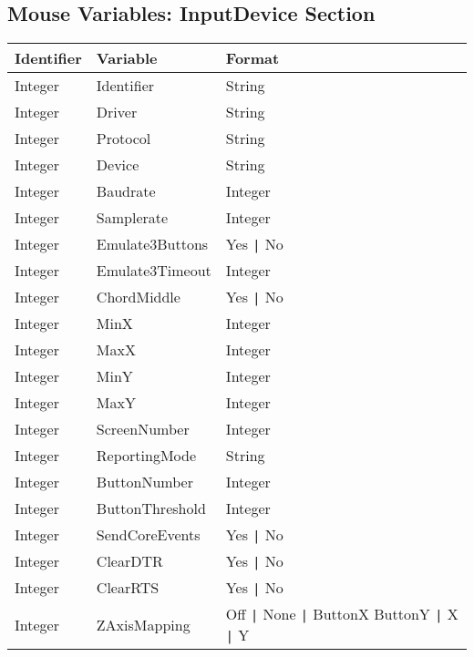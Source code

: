 \subsection{Mouse Variables: InputDevice Section}
\begin{tabular}[h]{|p{2cm}|p{4cm}|p{7cm}|}
 \hline
 \textbf{Identifier} & \textbf{Variable}     & \textbf{Format}        \\
 \hline
 Integer & Identifier       & String                             \\
 Integer & Driver           & String                             \\
 Integer & Protocol         & String                             \\
 Integer & Device           & String                             \\
 Integer & Baudrate         & Integer                            \\
 Integer & Samplerate       & Integer                            \\
 Integer & Emulate3Buttons  & Yes \verb+|+ No                    \\
 Integer & Emulate3Timeout  & Integer                            \\
 Integer & ChordMiddle      & Yes \verb+|+ No                    \\
 Integer & MinX             & Integer                            \\
 Integer & MaxX             & Integer                            \\
 Integer & MinY             & Integer                            \\
 Integer & MaxY             & Integer                            \\
 Integer & ScreenNumber     & Integer                            \\
 Integer & ReportingMode    & String                             \\
 Integer & ButtonNumber     & Integer                            \\
 Integer & ButtonThreshold  & Integer                            \\
 Integer & SendCoreEvents   & Yes \verb+|+ No                    \\
 Integer & ClearDTR         & Yes \verb+|+ No                    \\
 Integer & ClearRTS         & Yes \verb+|+ No                    \\
 Integer & ZAxisMapping     & Off \verb+|+ None \verb+|+ ButtonX ButtonY \verb+|+ X \verb+|+ Y \\

\end{tabular}

